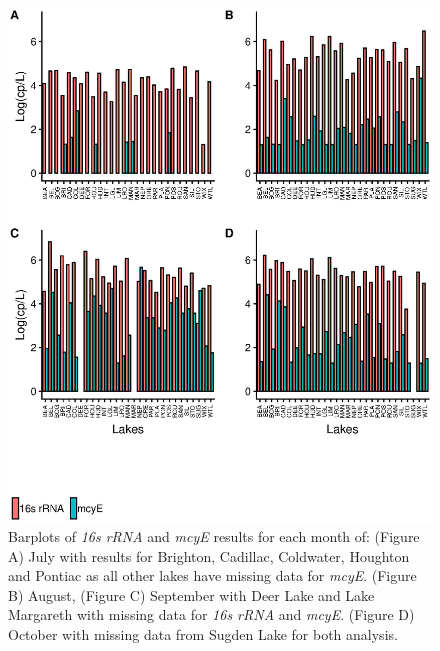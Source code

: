 \begin{figure}[p]
	\includegraphics[width=\textwidth]{figures/gene}
	\vspace*{-15mm}
	\caption{
Barplots of \emph{16s rRNA} and \emph{mcyE} results for each month of:
(Figure A) July with results for Brighton, Cadillac, Coldwater, Houghton and  Pontiac as all other lakes have missing data for \emph{mcyE}. 
(Figure B) August,
(Figure C) September with Deer Lake and Lake Margareth with missing data for \emph{16s rRNA} and \emph{mcyE}.
(Figure D) October with missing data from Sugden Lake for both analysis. 
}
	\label{fig:gene}
\end{figure}



